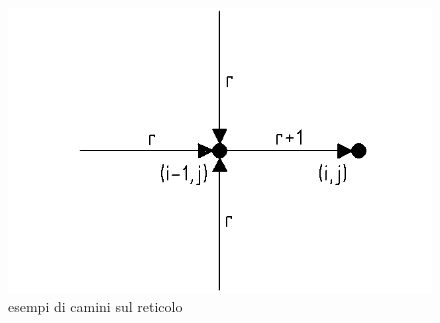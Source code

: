 \documentclass[11pt]{article}
\begin{document}
\begin{figure}[h]
\centering
\includegraphics[width=0.8\columnwidth]{v7}
\caption{esempi di camini sul reticolo}
\label{v6}
\end{figure}
\end{document}
